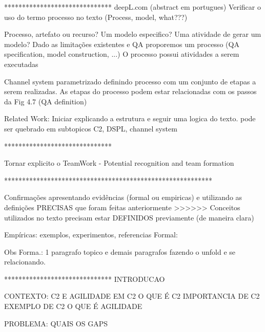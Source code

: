 ******************************
deepL.com (abstract em portugues)
Verificar o uso do termo processo no texto (Process, model, what???)


Processo, artefato ou recurso?
Um modelo especifico? Uma atividade de gerar um modelo?
Dado as limitações existentes e QA proporemos um processo (QA specification, model construction, ...)
O processo possui atividades a serem executadas

Channel system parametrizado definindo processo com um conjunto de etapas a serem realizadas. As etapas do processo podem estar relacionadas com os passos da Fig 4.7 (QA definition)



Related Work:
Iniciar explicando a estrutura e seguir uma logica do texto.
pode ser quebrado em subtopicos
C2, DSPL, channel system


******************************

Tornar explicito o TeamWork - Potential recognition and team formation





**********************************************************

Confirmações apresentando evidências (formal ou empiricas) e utilizando as definições PRECISAS que foram feitas anteriormente
>>>>>> Conceitos utilizados no texto precisam estar DEFINIDOS previamente (de maneira clara)

Empíricas: exemplos, experimentos, referencias
Formal:

Obs Forma.: 1 paragrafo topico e demais paragrafos fazendo o unfold e se relacionando.


******************************
INTRODUCAO

CONTEXTO: C2 E AGILIDADE EM C2
    O QUE É C2
    IMPORTANCIA DE C2
    EXEMPLO DE C2
    O QUE É AGILIDADE

PROBLEMA: QUAIS OS GAPS












